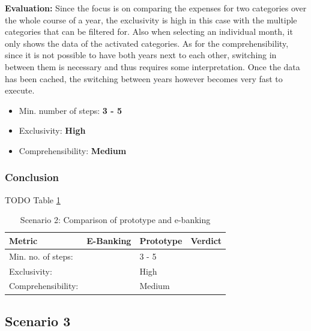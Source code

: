 \textbf{Evaluation:} Since the focus is on comparing the expenses for two categories over the whole course of a year, the exclusivity is high in this case with the multiple categories that can be filtered for. Also when selecting an individual month, it only shows the data of the activated categories. As for the comprehensibility, since it is not possible to have both years next to each other, switching in between them is necessary and thus requires some interpretation. Once the data has been cached, the switching between years however becomes very fast to execute.
\begin{itemize}[noitemsep,nolistsep]
	\item Min. number of steps: \textbf{3 - 5}
	\item Exclusivity: \textbf{High}
	\item Comprehensibility: \textbf{Medium}
\end{itemize}



\subsubsection{Conclusion}

TODO Table \ref{tbl:scenariotwocomparison}

\begin{table}[t]
	\begin{center}
		\begin{tabular}{ | p{3.2cm} | p{3.8cm} | p{3.5cm} | p{2.5cm} | }
			\hline
			\textbf{Metric} & \textbf{E-Banking} & \textbf{Prototype} & \textbf{Verdict} \\
			\hline
			Min. no. of steps: &  & 3 - 5 &  \\
			\hline
			Exclusivity: &  & High &  \\
			\hline
			Comprehensibility: &  & Medium &  \\
			\hline
		\end{tabular}
		\caption{Scenario 2: Comparison of prototype and e-banking}
		\label{tbl:scenariotwocomparison}
	\end{center}
\end{table}



\subsection{Scenario 3}

